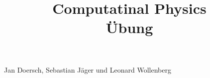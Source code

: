 \documentclass[a4paper, 12pt]{article}
\begin{document}
\title{
\textbf{Computatinal Physics\\
Übung}
}
\date{}
\maketitle

\begin{center}
Jan Doersch, Sebastian Jäger und Leonard Wollenberg
\end{center}

\end{document}
